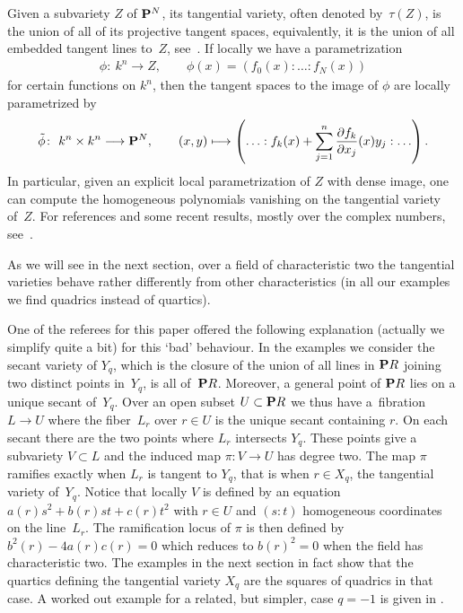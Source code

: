 \documentclass[pdftex]{sigma}
\newcommand{\PP}{{\bf P}}
\numberwithin{equation}{section}
\begin{document}
Given a subvariety $Z$ of $\PP^N$, its tangential variety, often denoted by~$\tau(Z)$, is the union of all of its projective tangent spaces, equivalently, it is the union of all embedded tangent lines to~$Z$, see~\cite{Z}. If locally we have a parametrization
\begin{gather*}
\phi\colon \ k^n \longrightarrow Z,\qquad \phi(x) = (f_0(x):\ldots:f_N(x))
\end{gather*}
for  certain functions on $k^n$, then the tangent spaces to the image of $\phi$ are locally parametrized by
\begin{gather*}
\tilde{\phi}\colon \ k^n\times k^n \longrightarrow \PP^N,\qquad (x,y) \longmapsto \left(\ldots: f_k(x)+\sum_{j=1}^n \frac{\partial f_k}{\partial x_j} (x)y_j:\ldots\right).
\end{gather*}
In particular, given an explicit local parametrization of $Z$ with dense image, one can compute the homogeneous polynomials vanishing on the tangential variety of~$Z$. For references and some recent results, mostly over the complex numbers, see~\cite{tangseg}.

As we will see in the next section, over a field of characteristic two the tangential varieties behave rather differently from other characteristics (in all our examples we find quadrics instead of quartics).

 One of the referees for this paper offered the following explanation (actually we simplify quite a bit) for this `bad' behaviour. In the examples we consider the secant variety of $Y_q$, which is the closure of the union of all lines in $\PP R$ joining two distinct points in~$Y_q$, is all of~$\PP R$. Moreover, a general point of $\PP R$ lies on a unique secant of~$Y_q$. Over an open subset $U\subset\PP R$ we thus have a~fibration $L\rightarrow U$ where the fiber~$L_r$ over $r\in U$ is the unique secant containing $r$.
On each secant there are the two points where $L_r$ intersects $Y_q$. These points give a subvariety $V\subset L$ and the induced map $\pi\colon V\rightarrow U$ has degree two. The map $\pi$ ramifies exactly when $L_r$ is tangent to $Y_q$, that is when $r\in X_q$, the tangential variety of~$Y_q$. Notice that locally $V$ is defined by an equation $a(r)s^2+b(r)st+c(r)t^2$ with $r\in U$ and $(s:t)$ homogeneous coordinates on the line~$L_r$. The ramification locus of $\pi$ is then defined by $b^2(r)-4a(r)c(r)=0$
which reduces to $b(r)^2=0$ when the field has characteristic two. The examples in the next section in fact show that the quartics defining the tangential variety $X_q$ are the squares of quadrics in that case. A worked out example for a related, but simpler, case $q=-1$ is given in \cite[Example~4.7]{Russo}.
\end{document}
